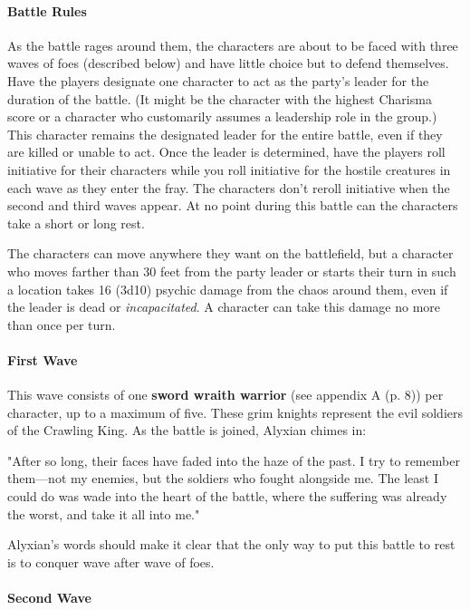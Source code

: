\documentclass[letterpaper, 11pt, bg=full, twocolumn]{dndbook}
\begin{document}
\paragraph{Battle Rules}

As the battle rages around them, the characters are about to be faced with three waves of foes (described below) and have little choice but to defend themselves. Have the players designate one character to act as the party's leader for the duration of the battle. (It might be the character with the highest Charisma score or a character who customarily assumes a leadership role in the group.) This character remains the designated leader for the entire battle, even if they are killed or unable to act. Once the leader is determined, have the players roll initiative for their characters while you roll initiative for the hostile creatures in each wave as they enter the fray. The characters don't reroll initiative when the second and third waves appear. At no point during this battle can the characters take a short or long rest.

The characters can move anywhere they want on the battlefield, but a character who moves farther than 30 feet from the party leader or starts their turn in such a location takes 16 (3d10) psychic damage from the chaos around them, even if the leader is dead or \textit{incapacitated}. A character can take this damage no more than once per turn.

\paragraph{First Wave}

This wave consists of one \textbf{sword wraith warrior} (see appendix A (p. 8)) per character, up to a maximum of five. These grim knights represent the evil soldiers of the Crawling King. As the battle is joined, Alyxian chimes in:

\begin{DndReadAloud}
"After so long, their faces have faded into the haze of the past. I try to remember them---not my enemies, but the soldiers who fought alongside me. The least I could do was wade into the heart of the battle, where the suffering was already the worst, and take it all into me."
\end{DndReadAloud}

Alyxian's words should make it clear that the only way to put this battle to rest is to conquer wave after wave of foes.

\paragraph{Second Wave}
\end{document}
